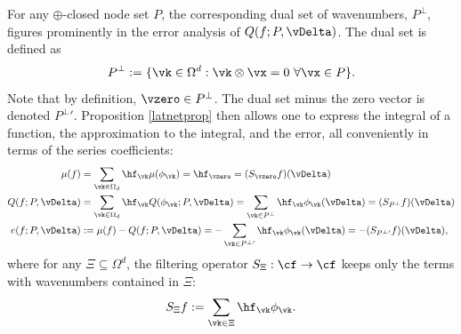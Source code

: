 \documentclass[graybox]{svmult}
\begin{document}
For any $\oplus$-closed node set $P$, the corresponding dual set of wavenumbers, $P^{\perp}$, figures prominently in the error analysis of $Q(f;P,\vDelta)$.  The dual set is defined as
\[
P^{\perp} := \{ \vk \in \Omega^d : \vk \otimes \vx = 0 \ \forall \vx \in P\}.
\]
Note that by definition, $\vzero \in P^{\perp}$.  The dual set minus the zero vector is denoted $P^{\perp}{}'$.  Proposition \ref{latnetprop} then allows one to express the integral of a function, the approximation to the integral, and the error, all conveniently in terms of the series coefficients:
\begin{align}
\nonumber
\mu(f) &= \sum_{\vk \in \Omega_d} \hf_{\vk} \mu(\phi_{\vk}) = \hf_{\vzero} = (S_{\vzero}f)(\vDelta)\\
\nonumber
Q(f;P,\vDelta) &= \sum_{\vk \in \Omega_d} \hf_{\vk} Q(\phi_{\vk};P,\vDelta) = \sum_{\vk \in P^{\perp}} \hf_{\vk}\phi_{\vk}(\vDelta) = (S_{P^{\perp}}f)(\vDelta) \\
\label{errorasfiltered}
e(f;P,\vDelta) &:= \mu(f) - Q(f;P,\vDelta) = - \sum_{\vk \in P^{\perp}{}'}  \hf_{\vk}\phi_{\vk}(\vDelta) = -(S_{P^{\perp}{}'}f)(\vDelta),
\end{align}
where for any $\Xi \subseteq \Omega^d$, the filtering operator $S_{\Xi}:\cf \to \cf$ keeps only the terms with wavenumbers contained in $\Xi$: 
\[
S_{\Xi}f := \sum_{\vk \in \Xi} \hf_{\vk} \phi_{\vk}.
\]
\end{document}
